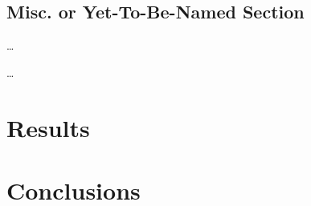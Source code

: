 \documentclass[nobib]{tufte-handout}
\newcommand{\placeholdertext}[1]{
	\noindent{\color{red}{#1}}
}
\begin{document}
\subsection{Misc. or Yet-To-Be-Named Section}
\placeholdertext{Alias analysis} \ldots \newline
\placeholdertext{} \ldots \newline

\section{Results}

\section{Conclusions}



\newpage
\nocite{*}


\end{document}
